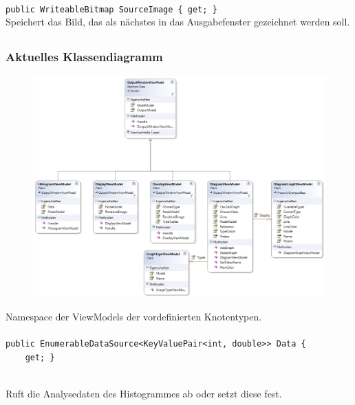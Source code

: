 \paragraph{}
\begin{itemize}
	\add \verb!public WriteableBitmap SourceImage { get; }! \\
	Speichert das Bild, das als nächstes in das Ausgabefenster gezeichnet werden soll.
\end{itemize}
\newpage

\subsection{}

\subsubsection*{Aktuelles Klassendiagramm}
\begin{figure}[h!]
\begin{center}
\includegraphics[width=\textwidth]{classdiagram/viewmodel-imp.png}
\end{center}
\end{figure}
Namespace der ViewModels der vordefinierten Knotentypen.
\newpage

\paragraph{}
\begin{itemize}
	\add \begin{verbatim}public EnumerableDataSource<KeyValuePair<int, double>> Data {
    get; }\end{verbatim} \\
	Ruft die Analysedaten des Histogrammes ab oder setzt diese fest.
\end{itemize}

